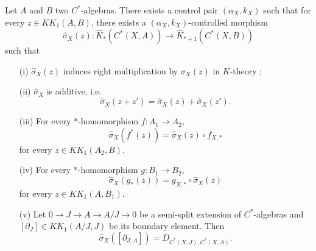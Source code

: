 \begin{prop}\label{Roe1}
Let $A$ and $B$ two $C^*$-algebras. There exists a control pair $(\alpha_X,k_X)$ such that for every $z\in KK_1(A,B)$, there exists a $(\alpha_X,k_X)$-controlled morphism
\[\hat\sigma_{X}(z) : \hat K_*(C^*(X,A))\rightarrow \hat K_{*+1}(C^*(X,B))\]
such that
\begin{enumerate}
\item[(i)] $\hat\sigma_X(z)$ induces right multiplication by $\sigma_{X}(z)$ in $K$-theory ;
\item[(ii)] $\hat\sigma_X$ is additive, i.e.
\[\hat\sigma_X(z+z')=\hat\sigma_X(z)+\hat\sigma_X(z').\]
\item[(iii)] For every $*$-homomorphism $f : A_1\rightarrow A_2$,
\[\hat\sigma_X(f^*(z))=\hat\sigma_X(z)\circ f_{X,*}\] for every $z\in KK_1(A_2,B)$.
\item[(iv)] For every $*$-homomorphism $g : B_1\rightarrow B_2$,
\[\hat\sigma_X(g_*(z))= g_{X,*}\circ \hat\sigma_X(z)\] for every $z\in KK_1(A,B_1)$.
\item[(v)] Let $0\rightarrow J\rightarrow A\rightarrow A/J\rightarrow 0$ be a semi-split extension of $C^*$-algebras and $[\partial_J]\in KK_1(A/J,J)$ be its boundary element. Then 
\[\hat\sigma_X([\partial_{J,A}])=D_{C^*(X,J),C^*(X,A)}.\] 
\end{enumerate}
\end{prop}

